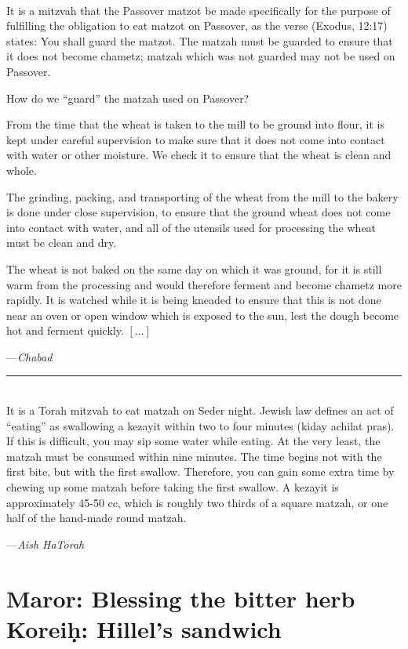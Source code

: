 \documentclass[a4paper,12pt,openany]{memoir}
\newcommand{\HgEllipsis}{\ensuremath{\left[\ldots\right]}}
\newcommand{\HgSource}[1]{\hfill{\small---\itshape{#1}}}
\newcommand{\HgFill}{\vfill \hrule \vfill}
\newenvironment{HgEnglish}{\strut\\\noindent}{\vspace{1em}}
\begin{document}
\begin{HgEnglish}
  It is a mitzvah that the Passover matzot be made specifically for the purpose
  of fulfilling the obligation to eat matzot on Passover, as the verse (Exodus,
  12:17) states: You shall guard the matzot. The matzah must be guarded to
  ensure that it does not become chametz; matzah which was not guarded may not
  be used on Passover.

  How do we ``guard'' the matzah used on Passover? 

  From the time that the wheat is taken to the mill to be ground into flour, it
  is kept under careful supervision to make sure that it does not come into
  contact with water or other moisture. We check it to ensure that the wheat is
  clean and whole.  

  The grinding, packing, and transporting of the wheat from the mill to the
  bakery is done under close supervision, to ensure that the ground wheat does
  not come into contact with water, and all of the utensils used for processing
  the wheat must be clean and dry.  

  The wheat is not baked on the same day on which it was ground, for it is still
  warm from the processing and would therefore ferment and become chametz more
  rapidly. It is watched while it is being kneaded to ensure that this is not
  done near an oven or open window which is exposed to the sun, lest the dough
  become hot and ferment quickly.  
  \HgEllipsis

  \HgSource{Chabad}
\end{HgEnglish}


\HgFill

\begin{HgEnglish}
  It is a Torah mitzvah to eat matzah on Seder night.  Jewish law defines an act
  of ``eating'' as swallowing a kezayit within two to four minutes (kiday
  achilat pras). If this is difficult, you may sip some water while eating. At
  the very least, the matzah must be consumed within nine minutes.  The time
  begins not with the first bite, but with the first swallow.  Therefore, you
  can gain some extra time by chewing up some matzah before taking the first
  swallow.  A kezayit is approximately 45-50 cc, which is roughly two thirds of
  a square matzah, or one half of the hand-made round matzah.

  \HgSource{Aish HaTorah}
\end{HgEnglish}

\chapter*{Maror: Blessing the bitter herb \\
         Korei\d{h}: Hillel's sandwich}
\vfill
\end{document}
